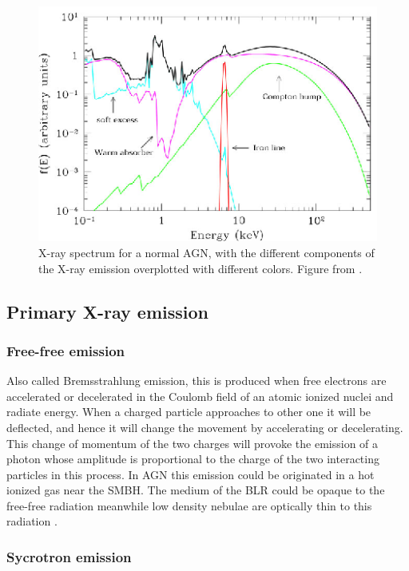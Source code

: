  \begin{figure}
 \centering
 \includegraphics[width=\textwidth]{Chapter1_intro/xagn.ps}
    \caption{X-ray spectrum for a normal AGN, with the different components of the X-ray emission overplotted with different colors. Figure from \cite{risaliti04}.}
 \label{sec1:fig_xe}
 \end{figure}


\subsection{Primary X-ray emission}
\label{sec1:xem}

\subsubsection{Free-free emission}
\label{sec1:ffem}

Also called Bremsstrahlung emission, this is produced when free electrons are accelerated or decelerated in the Coulomb field of an atomic ionized nuclei and radiate energy. When a charged particle approaches to other one it will be deflected, and hence it will change the movement by accelerating or decelerating. This change of momentum of the two charges will provoke the emission of a photon whose amplitude is proportional to the charge of the two interacting particles in this process. In AGN this emission could be originated in a hot ionized gas near the SMBH. The medium of the BLR could be opaque to the free-free radiation meanwhile low density nebulae are optically thin to this radiation \citep{netzer90}.

\subsubsection{Sycrotron emission}
\label{sec1:syem}

